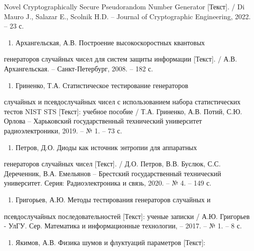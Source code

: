 Novel Cryptographically Secure Pseudorandom Number Generator
{[}Текст{]}. / Di Mauro J., Salazar E., Scolnik H.D. -- Journal of
Cryptographic Engineering, 2022. -- 23 с.

\begin{enumerate}
\def\labelenumi{\arabic{enumi}}
\setcounter{enumi}{6}
\item
  Архангельская, А.В. Построение высокоскоростных квантовых
\end{enumerate}

генераторов случайных чисел для систем защиты информации {[}Текст{]}. /
А.В. Архангельская. -- Санкт-Петербург, 2008. -- 182 с.

\begin{enumerate}
\def\labelenumi{\arabic{enumi}}
\setcounter{enumi}{7}
\item
  Гриненко, Т.А. Статистическое тестирование генераторов
\end{enumerate}

случайных и псевдослучайных чисел с использованием набора статистических
тестов NIST STS {[}Текст{]}: учебное пособие / Т.А. Гриненко, А.В.
Потий, С.Ю. Орлова -- Харьковский государственный технический
университет радиоэлектроники, 2019. -- № 1. -- 73 с.

\begin{enumerate}
\def\labelenumi{\arabic{enumi}}
\setcounter{enumi}{8}
\item
  Петров, Д.О. Диоды как источник энтропии для аппаратных
\end{enumerate}

генераторов случайных чисел {[}Текст{]}. / Д.О. Петров, В.В. Буслюк,
С.С. Дереченник, В.А. Емельянов -- Брестский государственный технический
университет. Серия: Радиоэлектроника и связь, 2020. -- № 4. -- 149 с.

\begin{enumerate}
\def\labelenumi{\arabic{enumi}}
\setcounter{enumi}{9}
\item
  Григорьев, А.Ю. Методы тестирования генераторов случайных и
\end{enumerate}

псевдослучайных последовательностей {[}Текст{]}: ученые записки / А.Ю.
Григорьев - УлГУ. Сер. Математика и информационные технологии, -- 2017.
-- № 1. -- 8 с.

\begin{enumerate}
\def\labelenumi{\arabic{enumi}}
\setcounter{enumi}{10}
\item
  Якимов, А.В. Физика шумов и флуктуаций параметров {[}Текст{]}:
\end{enumerate}

